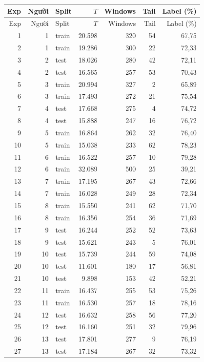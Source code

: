 \begin{longtable}{@{}rrlrrrr@{}}
\toprule Exp & Người & Split & $T$ & Windows & Tail & Label (\%) \\
\midrule\endfirsthead
\toprule Exp & Người & Split & $T$ & Windows & Tail & Label (\%) \\
\midrule\endhead
1 & 1 & train & 20.598 & 320 & 54 & 67,75 \\
2 & 1 & train & 19.286 & 300 & 22 & 72,33 \\
3 & 2 & test & 18.026 & 280 & 42 & 72,11 \\
4 & 2 & test & 16.565 & 257 & 53 & 70,43 \\
5 & 3 & train & 20.994 & 327 & 2 & 65,89 \\
6 & 3 & train & 17.493 & 272 & 21 & 75,54 \\
7 & 4 & test & 17.668 & 275 & 4 & 74,72 \\
8 & 4 & test & 15.888 & 247 & 16 & 76,72 \\
9 & 5 & train & 16.864 & 262 & 32 & 76,40 \\
10 & 5 & train & 15.038 & 233 & 62 & 78,23 \\
11 & 6 & train & 16.522 & 257 & 10 & 79,28 \\
12 & 6 & train & 32.089 & 500 & 25 & 39,21 \\
13 & 7 & train & 17.195 & 267 & 43 & 72,66 \\
14 & 7 & train & 16.028 & 249 & 28 & 72,34 \\
15 & 8 & train & 15.550 & 241 & 62 & 71,70 \\
16 & 8 & train & 16.356 & 254 & 36 & 71,69 \\
17 & 9 & test & 16.244 & 252 & 52 & 73,63 \\
18 & 9 & test & 15.621 & 243 & 5 & 76,01 \\
19 & 10 & test & 15.739 & 244 & 59 & 74,08 \\
20 & 10 & test & 11.601 & 180 & 17 & 56,81 \\
21 & 10 & test & 9.898 & 153 & 42 & 52,21 \\
22 & 11 & train & 16.437 & 255 & 53 & 75,26 \\
23 & 11 & train & 16.530 & 257 & 18 & 78,16 \\
24 & 12 & test & 16.632 & 258 & 56 & 77,20 \\
25 & 12 & test & 16.160 & 251 & 32 & 79,96 \\
26 & 13 & test & 17.801 & 277 & 9 & 76,19 \\
27 & 13 & test & 17.184 & 267 & 32 & 73,32 \\

\end{longtable}
